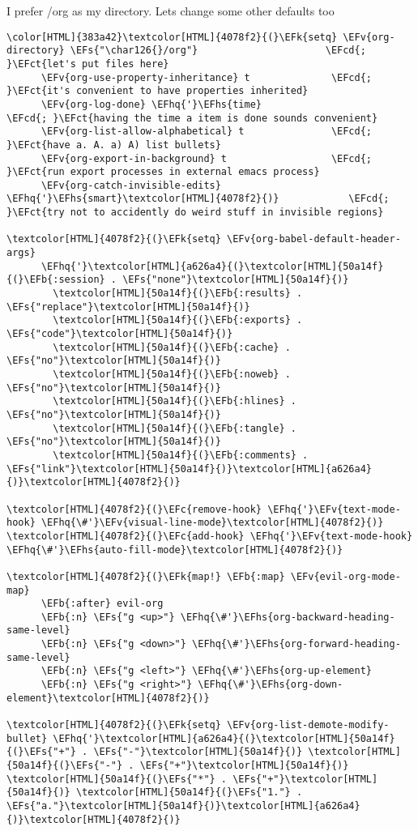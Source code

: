 \documentclass{scrartcl}
\newcommand{\EFk}[1]{\textcolor{EFk}{#1}} %
\newcommand{\EFs}[1]{\textcolor{EFs}{#1}} %
\newcommand{\EFb}[1]{\textcolor{EFb}{#1}} %
\newcommand{\EFct}[1]{\textcolor{EFct}{#1}} %
\newcommand{\EFc}[1]{\textcolor{EFc}{#1}} %
\newcommand{\EFv}[1]{\textcolor{EFv}{#1}} %
\newcommand{\EFcd}[1]{\textcolor{EFcd}{#1}} %
\newcommand{\EFhq}[1]{\textcolor{EFhq}{#1}} %
\newcommand{\EFhs}[1]{\textcolor{EFhs}{#1}} %
\begin{document}
I prefer /org as my directory. Lets change some other defaults too
\begin{Code}
\begin{Verbatim}[]
\color[HTML]{383a42}\textcolor[HTML]{4078f2}{(}\EFk{setq} \EFv{org-directory} \EFs{"\char126{}/org"}                      \EFcd{; }\EFct{let's put files here}
      \EFv{org-use-property-inheritance} t              \EFcd{; }\EFct{it's convenient to have properties inherited}
      \EFv{org-log-done} \EFhq{'}\EFhs{time}                          \EFcd{; }\EFct{having the time a item is done sounds convenient}
      \EFv{org-list-allow-alphabetical} t               \EFcd{; }\EFct{have a. A. a) A) list bullets}
      \EFv{org-export-in-background} t                  \EFcd{; }\EFct{run export processes in external emacs process}
      \EFv{org-catch-invisible-edits} \EFhq{'}\EFhs{smart}\textcolor[HTML]{4078f2}{)}            \EFcd{; }\EFct{try not to accidently do weird stuff in invisible regions}

\textcolor[HTML]{4078f2}{(}\EFk{setq} \EFv{org-babel-default-header-args}
      \EFhq{'}\textcolor[HTML]{a626a4}{(}\textcolor[HTML]{50a14f}{(}\EFb{:session} . \EFs{"none"}\textcolor[HTML]{50a14f}{)}
        \textcolor[HTML]{50a14f}{(}\EFb{:results} . \EFs{"replace"}\textcolor[HTML]{50a14f}{)}
        \textcolor[HTML]{50a14f}{(}\EFb{:exports} . \EFs{"code"}\textcolor[HTML]{50a14f}{)}
        \textcolor[HTML]{50a14f}{(}\EFb{:cache} . \EFs{"no"}\textcolor[HTML]{50a14f}{)}
        \textcolor[HTML]{50a14f}{(}\EFb{:noweb} . \EFs{"no"}\textcolor[HTML]{50a14f}{)}
        \textcolor[HTML]{50a14f}{(}\EFb{:hlines} . \EFs{"no"}\textcolor[HTML]{50a14f}{)}
        \textcolor[HTML]{50a14f}{(}\EFb{:tangle} . \EFs{"no"}\textcolor[HTML]{50a14f}{)}
        \textcolor[HTML]{50a14f}{(}\EFb{:comments} . \EFs{"link"}\textcolor[HTML]{50a14f}{)}\textcolor[HTML]{a626a4}{)}\textcolor[HTML]{4078f2}{)}

\textcolor[HTML]{4078f2}{(}\EFc{remove-hook} \EFhq{'}\EFv{text-mode-hook} \EFhq{\#'}\EFv{visual-line-mode}\textcolor[HTML]{4078f2}{)}
\textcolor[HTML]{4078f2}{(}\EFc{add-hook} \EFhq{'}\EFv{text-mode-hook} \EFhq{\#'}\EFhs{auto-fill-mode}\textcolor[HTML]{4078f2}{)}

\textcolor[HTML]{4078f2}{(}\EFk{map!} \EFb{:map} \EFv{evil-org-mode-map}
      \EFb{:after} evil-org
      \EFb{:n} \EFs{"g <up>"} \EFhq{\#'}\EFhs{org-backward-heading-same-level}
      \EFb{:n} \EFs{"g <down>"} \EFhq{\#'}\EFhs{org-forward-heading-same-level}
      \EFb{:n} \EFs{"g <left>"} \EFhq{\#'}\EFhs{org-up-element}
      \EFb{:n} \EFs{"g <right>"} \EFhq{\#'}\EFhs{org-down-element}\textcolor[HTML]{4078f2}{)}

\textcolor[HTML]{4078f2}{(}\EFk{setq} \EFv{org-list-demote-modify-bullet} \EFhq{'}\textcolor[HTML]{a626a4}{(}\textcolor[HTML]{50a14f}{(}\EFs{"+"} . \EFs{"-"}\textcolor[HTML]{50a14f}{)} \textcolor[HTML]{50a14f}{(}\EFs{"-"} . \EFs{"+"}\textcolor[HTML]{50a14f}{)} \textcolor[HTML]{50a14f}{(}\EFs{"*"} . \EFs{"+"}\textcolor[HTML]{50a14f}{)} \textcolor[HTML]{50a14f}{(}\EFs{"1."} . \EFs{"a."}\textcolor[HTML]{50a14f}{)}\textcolor[HTML]{a626a4}{)}\textcolor[HTML]{4078f2}{)}
\end{Verbatim}
\end{Code}
\end{document}
